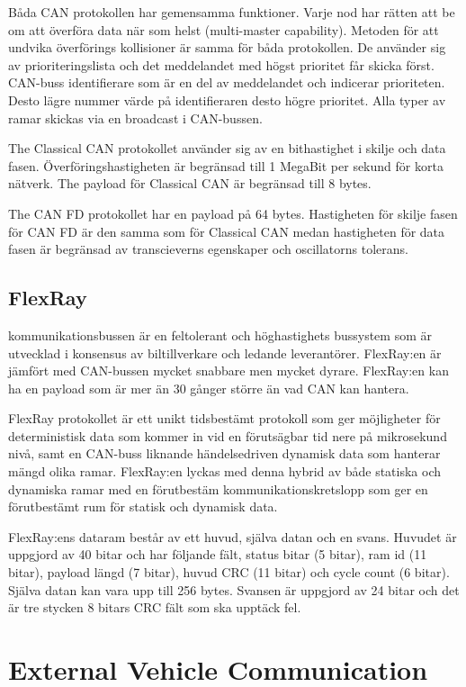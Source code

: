 \documentclass[a4paper]{IEEEtran}
\begin{document}
Båda CAN protokollen har gemensamma funktioner. Varje nod har rätten att be om att överföra data när som helst (multi-master capability). Metoden för att undvika överförings kollisioner är samma för båda protokollen. De använder sig av prioriteringslista och det meddelandet med högst prioritet får skicka först. CAN-buss identifierare som är en del av meddelandet och indicerar prioriteten. Desto lägre nummer värde på identifieraren desto högre prioritet. Alla typer av ramar skickas via en broadcast i CAN-bussen. 

The Classical CAN protokollet använder sig av en bithastighet i skilje och data fasen. Överföringshastigheten är begränsad till 1 MegaBit per sekund för korta nätverk. The payload för Classical CAN är begränsad till 8 bytes.

The CAN FD protokollet har en payload på 64 bytes. Hastigheten för skilje fasen för CAN FD är den samma som för Classical CAN medan hastigheten för data fasen är begränsad av transcieverns egenskaper och oscillatorns tolerans. \cite{CANdata}

\subsection{FlexRay} \label{sec:FlexRay}
kommunikationsbussen är en feltolerant och höghastighets bussystem som är utvecklad i konsensus av biltillverkare och ledande leverantörer. 
FlexRay:en är jämfört med CAN-bussen mycket snabbare men mycket dyrare. 
FlexRay:en kan ha en payload som är mer än 30 gånger större än vad CAN kan hantera.

FlexRay protokollet är ett unikt tidsbestämt protokoll som ger möjligheter för deterministisk data som kommer in vid en förutsägbar tid nere på mikrosekund nivå, samt en CAN-buss liknande händelsedriven dynamisk data som hanterar mängd olika ramar. 
FlexRay:en lyckas med denna hybrid av både statiska och dynamiska ramar med en förutbestäm kommunikationskretslopp som ger en förutbestämt rum för statisk och dynamisk data. 

FlexRay:ens dataram består av ett huvud, själva datan och en svans. Huvudet är uppgjord av 40 bitar och har följande fält, status bitar (5 bitar), ram id (11 bitar), payload längd (7 bitar), huvud CRC (11 bitar) och cycle count (6 bitar). 
Själva datan kan vara upp till 256 bytes. Svansen är uppgjord av 24 bitar och det är tre stycken 8 bitars CRC fält som ska upptäck fel. \cite{FlexRayOverview}

\section{External Vehicle Communication}
\end{document}
